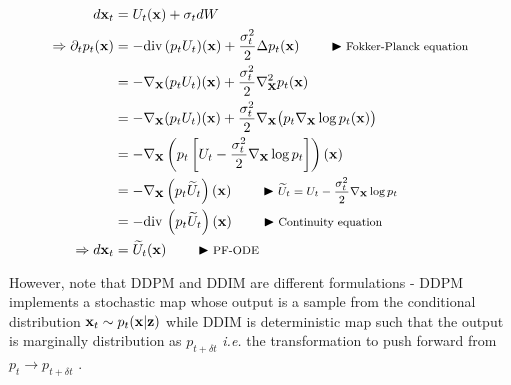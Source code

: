 \documentclass[a4paper, 11pt]{article}
\begin{document}
\begin{align}
    d\vx_t &= U_t(\vx) + \sigma_t dW \\
    \Rightarrow \partial_t p_t(\vx) &= -\diver (p_t U_t)(\vx) + \frac{\sigma_t^2}{2} \Delta p_t(\vx) \eqcomment{Fokker-Planck equation}\\
    &= -\nabla_{\vx} (p_t U_t)(\vx) + \frac{\sigma_t^2}{2} \nabla_{\vx}^2 p_t(\vx) \\ 
    &= -\nabla_{\vx} (p_t U_t)(\vx) + \frac{\sigma_t^2}{2} \nabla_{\vx} \big (p_t \nabla_{\vx} \log p_t(\vx) \big ) \\ 
    &= -\nabla_{\vx} \left ( p_t \left [ U_t - \frac{\sigma_t^2}{2}\nabla_{\vx} \log p_t \right ] \right ) (\vx) \\ 
    &= -\nabla_{\vx} \left ( p_t \widetilde{U}_t\right ) (\vx) \eqcomment{$\widetilde{U}_t = U_t - \frac{\sigma_t^2}{2}\nabla_{\vx} \log p_t$} \\ 
    &= -\diver \left ( p_t \widetilde{U}_t\right ) (\vx) \eqcomment{Continuity equation}\\
    \Rightarrow d\vx_t &= \widetilde{U}_t(\vx) \eqcomment{PF-ODE}
\end{align}


However, note that DDPM and DDIM are different formulations - DDPM implements a stochastic map  whose output is a sample from the conditional distribution $\vx_t \sim p_t(\vx | \vz)$ while DDIM is deterministic map such that the output is marginally distribution as $p_{t + \delta t}$ \textit{i.e.} the transformation to push forward from $p_t \to p_{t + \delta t}$ \citep{nakkiran2024step}.





\end{document}
